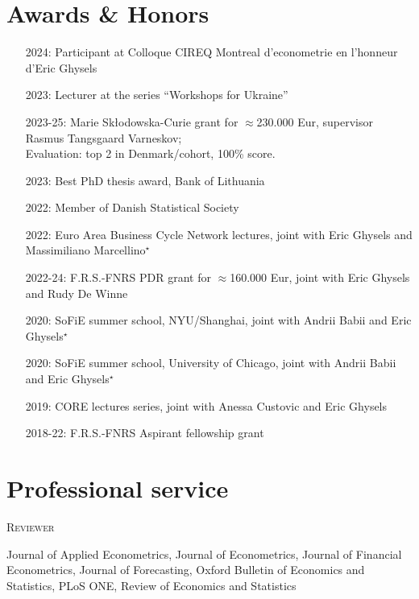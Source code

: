 \documentclass[10pt]{article}
\newcommand{\thestarnogap}{{\Large{\color{blue}\ensuremath{^\star}}}}
\begin{document}
	\section*{Awards \& Honors}
	\vspace{-0.5em}
	\begin{itemize}[leftmargin=4.5em]
		\setlength\itemsep{-0.1em}
		\item[2024:] Participant at Colloque CIREQ Montreal d'econometrie en l'honneur d'Eric Ghysels
		\item[2023:] Lecturer at the series ``Workshops for Ukraine''
		\item[2023-25:] Marie Skłodowska-Curie grant for $\approx$230.000 Eur, supervisor Rasmus Tangsgaard Varneskov; \\ %
		\hspace*{0.5em} Evaluation: top 2 in Denmark/cohort, 100\% score.
		\item[2023:] Best PhD thesis award, Bank of Lithuania
		\item[2022:] Member of Danish Statistical Society
		\item[2022:] Euro Area Business Cycle Network lectures, joint with Eric Ghysels and Massimiliano Marcellino\thestarnogap
		\item[2022-24:] F.R.S.-FNRS PDR grant for $\approx$160.000 Eur, joint with Eric Ghysels and Rudy De Winne
		\item[2020:] SoFiE summer school, NYU/Shanghai, joint with Andrii Babii and Eric Ghysels\thestarnogap
		\item[2020:] SoFiE summer school, University of Chicago, joint with Andrii Babii and Eric Ghysels\thestarnogap
		\item[2019:] CORE lectures series, joint with Anessa Custovic and Eric Ghysels
		\item[2018-22:] F.R.S.-FNRS Aspirant fellowship grant
	\end{itemize}
	
	

	
	\section*{Professional service}
	\vspace{-0.5em}
	\hspace{1em}\textsc{Reviewer}
	
	\smallskip
	
	\hspace{1em} Journal of Applied Econometrics, Journal of Econometrics, Journal of Financial Econometrics, Journal of Forecasting, Oxford Bulletin of Economics and Statistics,  PLoS ONE, Review of Economics and Statistics
	
\end{document}
